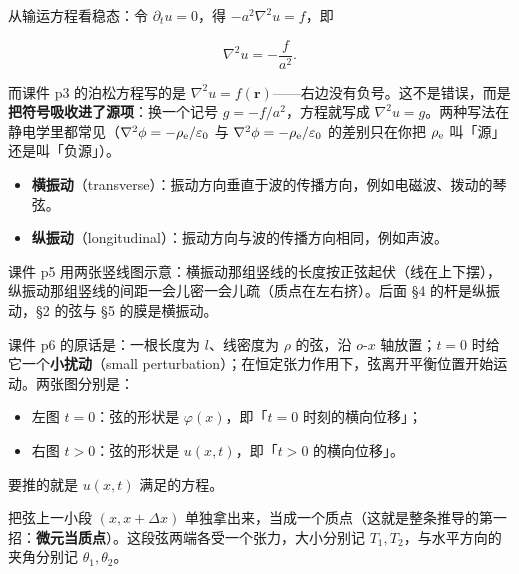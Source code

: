 \documentclass[11pt]{ctexart}
\let\origsubhdr\subhdr
\renewcommand{\subhdr}[1]{\par\needspace{3\baselineskip}\origsubhdr{#1}}
\let\orighdr\hdr
\renewcommand{\hdr}[2]{\par\needspace{6\baselineskip}\orighdr{#1}{#2}}
\begin{document}
从输运方程看稳态：令 $\partial_t u=0$，得 $-a^2\nabla^2u=f$，即

\[
\nabla^2u=-\frac{f}{a^2}.
\]

而课件 p3 的泊松方程写的是 $\nabla^2u=f(\mathbf r)$——右边没有负号。这不是错误，而是\textbf{把符号吸收进了源项}：换一个记号 $g=-f/a^2$，方程就写成 $\nabla^2u=g$。两种写法在静电学里都常见（$\nabla^2\phi=-\rho_{\rm e}/\varepsilon_0$ 与 $\nabla^2\phi=-\rho_{\rm e}/\varepsilon_0$ 的差别只在你把 $\rho_{\rm e}$ 叫「源」还是叫「负源」）。




\begin{itemize}
\item \textbf{横振动}（transverse）：振动方向垂直于波的传播方向，例如电磁波、拨动的琴弦。
\item \textbf{纵振动}（longitudinal）：振动方向与波的传播方向相同，例如声波。
\end{itemize}

课件 p5 用两张竖线图示意：横振动那组竖线的长度按正弦起伏（线在上下摆），纵振动那组竖线的间距一会儿密一会儿疏（质点在左右挤）。后面 §4 的杆是纵振动，§2 的弦与 §5 的膜是横振动。


课件 p6 的原话是：一根长度为 $l$、线密度为 $\rho$ 的弦，沿 $o$-$x$ 轴放置；$t=0$ 时给它一个\textbf{小扰动}（small perturbation）；在恒定张力作用下，弦离开平衡位置开始运动。两张图分别是：

\begin{itemize}
\item 左图 $t=0$：弦的形状是 $\varphi(x)$，即「$t=0$ 时刻的横向位移」；
\item 右图 $t>0$：弦的形状是 $u(x,t)$，即「$t>0$ 的横向位移」。
\end{itemize}

要推的就是 $u(x,t)$ 满足的方程。


把弦上一小段 $(x,x+\Delta x)$ 单独拿出来，当成一个质点（这就是整条推导的第一招：\textbf{微元当质点}）。这段弦两端各受一个张力，大小分别记 $T_1,T_2$，与水平方向的夹角分别记 $\theta_1,\theta_2$。
\end{document}
